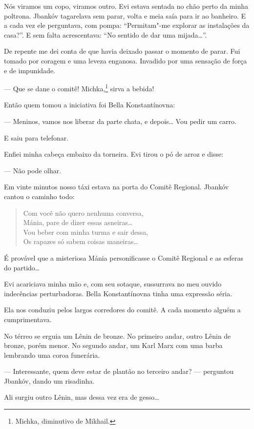 Nós viramos um copo, viramos outro. Evi estava sentada no chão perto da
minha poltrona. Jbankóv tagarelava sem parar, volta e meia saía para ir
ao banheiro. E a cada vez ele perguntava, com pompa: ``Permitam"-me
explorar as instalações da casa?''. E sem falta acrescentava: ``No
sentido de dar uma mijada\ldots{}''.

De repente me dei conta de que havia deixado passar o momento de parar.
Fui tomado por coragem e uma leveza enganosa. Invadido por uma sensação
de força e de impunidade.

--- Que se dane o comitê! Michka,\footnote{Michka, diminutivo de Mikhail.} sirva a bebida!

Então quem tomou a iniciativa foi Bella Konstantínovna:

--- Meninos, vamos nos liberar da parte chata, e depois\ldots{} Vou pedir um carro.

E saiu para telefonar.

Enfiei minha cabeça embaixo da torneira. Evi tirou o pó de arroz e
disse:

--- Não pode olhar.

Em vinte minutos nosso táxi estava na porta do Comitê Regional. Jbankóv
cantou o caminho todo:

\begin{verse}
Com você não quero nenhuma conversa,\\
Mánia, pare de dizer essas asneiras\ldots{}\\
Vou beber com minha turma e sair dessa,\\
Os rapazes só sabem coisas maneiras\ldots{}
\end{verse}

É provável que a misteriosa Mánia personificasse o Comitê Regional e as
esferas do partido\ldots{}

Evi acariciava minha mão e, com seu sotaque, sussurrava no meu ouvido
indecências perturbadoras. Bella Konstantínovna tinha uma expressão
séria.

Ela nos conduziu pelos largos corredores do comitê. A cada momento
alguém a cumprimentava.

No térreo se erguia um Lênin de bronze. No primeiro andar, outro Lênin
de bronze, porém menor. No segundo andar, um Karl Marx com uma barba
lembrando uma coroa funerária.

--- Interessante, quem deve estar de plantão no terceiro andar?
--- perguntou Jbankóv, dando um risadinha.

Ali surgiu outro Lênin, mas dessa vez era de gesso\ldots{}

